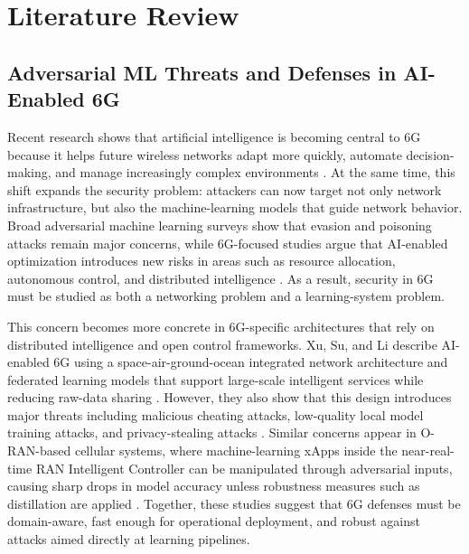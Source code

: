 \documentclass[letterpaper]{article} %
\begin{document}
\section{Literature Review}


\subsection{Adversarial ML Threats and Defenses in AI-Enabled 6G}
Recent research shows that artificial intelligence is becoming central to 6G because it helps future wireless networks adapt more quickly, automate decision-making, and manage increasingly complex environments \cite{bountakas2023defense,xu2022security}. At the same time, this shift expands the security problem: attackers can now target not only network infrastructure, but also the machine-learning models that guide network behavior. Broad adversarial machine learning surveys show that evasion and poisoning attacks remain major concerns, while 6G-focused studies argue that AI-enabled optimization introduces new risks in areas such as resource allocation, autonomous control, and distributed intelligence \cite{bountakas2023defense,xu2022security}. As a result, security in 6G must be studied as both a networking problem and a learning-system problem.

This concern becomes more concrete in 6G-specific architectures that rely on distributed intelligence and open control frameworks. Xu, Su, and Li describe AI-enabled 6G using a space-air-ground-ocean integrated network architecture and federated learning models that support large-scale intelligent services while reducing raw-data sharing \cite{xu2022security}. However, they also show that this design introduces major threats including malicious cheating attacks, low-quality local model training attacks, and privacy-stealing attacks \cite{xu2022security}. Similar concerns appear in O-RAN-based cellular systems, where machine-learning xApps inside the near-real-time RAN Intelligent Controller can be manipulated through adversarial inputs, causing sharp drops in model accuracy unless robustness measures such as distillation are applied \cite{chiejina2024oran}. Together, these studies suggest that 6G defenses must be domain-aware, fast enough for operational deployment, and robust against attacks aimed directly at learning pipelines.
\end{document}
